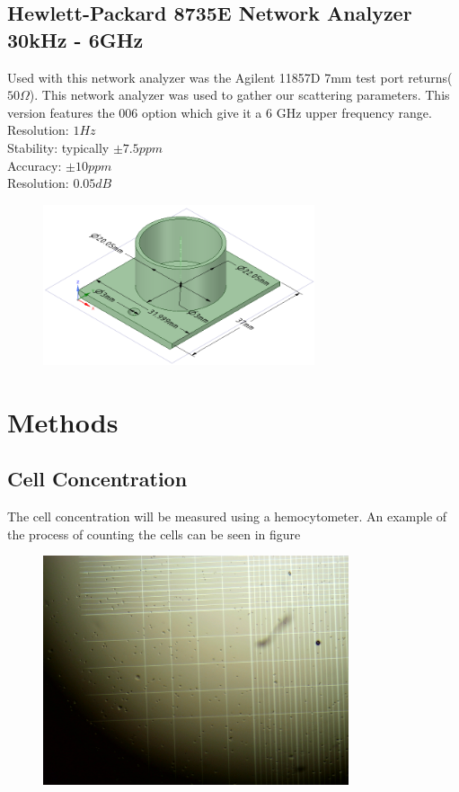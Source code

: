 \documentclass[journal]{IEEEtran}
\begin{document}
\subsection{Hewlett-Packard 8735E Network Analyzer 30kHz - 6GHz}
Used with this network analyzer was the Agilent 11857D 7mm test port returns($50\Omega$). This network analyzer was used to gather our scattering parameters. This version features the 006 option which give it a 6 GHz upper frequency range.\\
Resolution: $1 Hz$ \\
Stability: typically $\pm7.5 ppm$ \\
Accuracy: $\pm10 ppm$\\
Resolution: $0.05 dB$


\begin{figure}[h]
\label{test-fixture}
\includegraphics[width=8cm]{Beaker.png}
\end{figure}

\section{Methods}

\subsection{Cell Concentration}
The cell concentration will be measured using a hemocytometer. An example of the process of counting the cells can be seen in figure

\begin{figure}[h]
\label{hemocytometer}
\includegraphics[width=9cm]{hemocytometer.jpg}
\end{figure}
\end{document}
